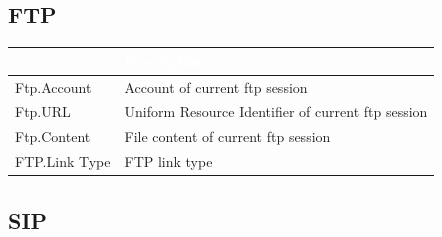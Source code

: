 \subsection*{\hypertarget{link:FTP}{FTP}}
\label{sec:appendix_c:protocol:FTP}

\begin{longtable}{p{}|p{}}   
    \rowcolor{black}\multicolumn{1}{l!\vlinewhite}{\textcolor{white}{Field}}  & \textcolor{white}{Description} \\\hline
    Ftp.Account &	Account of current ftp session \\\hline
    Ftp.URL &	Uniform Resource Identifier of current ftp session \\\hline
    Ftp.Content &	File content of current ftp session   \\\hline
    FTP.Link Type &	FTP link type \\\hline
\end{longtable} 

\subsection*{\hypertarget{link:SIP}{SIP}}
\label{sec:appendix_c:protocol:SIP}

